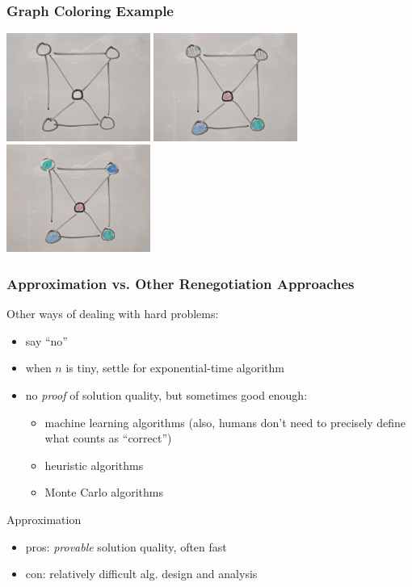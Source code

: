 \documentclass{beamer}
\begin{document}
  \begin{frame} \frametitle{Graph Coloring Example}
    \begin{center}
      \includegraphics[height=100pt]{13-graph-uncolored.jpg}
      \includegraphics[height=100pt]{13-graph-colored-suboptimal.jpg}
      \includegraphics[height=100pt]{13-graph-colored-optimal.jpg}
    \end{center}
  \end{frame}
  
  \begin{frame} \frametitle{Approximation vs. Other Renegotiation Approaches}
  Other ways of dealing with hard problems:
  \begin{itemize}
    \item say ``no''
    \item when $n$ is tiny, settle for exponential-time algorithm
    \item no \emph{proof} of solution quality, but sometimes good enough:
      \begin{itemize}
        \item machine learning algorithms (also, humans don't need to precisely define what counts as ``correct'')
        \item heuristic algorithms
        \item Monte Carlo algorithms
      \end{itemize}
  \end{itemize}
  
  Approximation
  \begin{itemize}
    \item pros: \emph{provable} solution quality, often fast
    \item con: relatively difficult alg. design and analysis
  \end{itemize}
  \end{frame}
  
\end{document}
